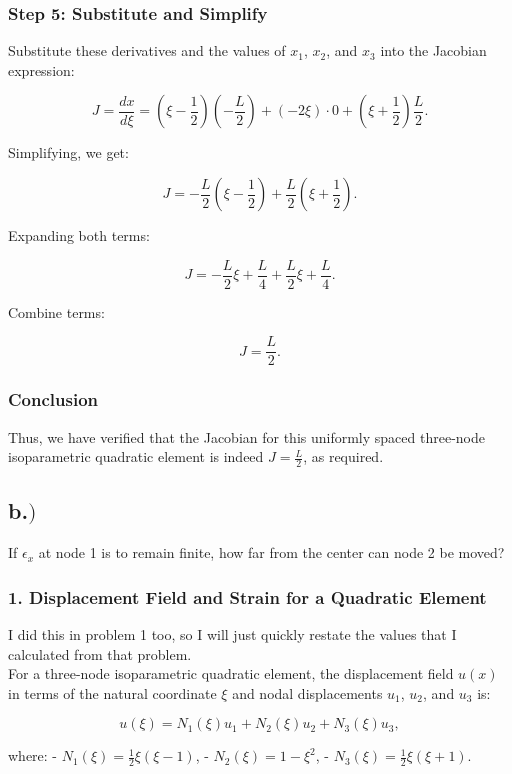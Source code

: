 \subsubsection*{Step 5: Substitute and Simplify}
Substitute these derivatives and the values of \( x_1 \), \( x_2 \), and \( x_3 \) into the Jacobian expression:

\[
J = \frac{dx}{d\xi} = \left(\xi - \frac{1}{2}\right) \left(-\frac{L}{2}\right) + (-2\xi) \cdot 0 + \left(\xi + \frac{1}{2}\right) \frac{L}{2}.
\]

Simplifying, we get:

\[
J = -\frac{L}{2} \left(\xi - \frac{1}{2}\right) + \frac{L}{2} \left(\xi + \frac{1}{2}\right).
\]

Expanding both terms:

\[
J = -\frac{L}{2} \xi + \frac{L}{4} + \frac{L}{2} \xi + \frac{L}{4}.
\]

Combine terms:

\[
J = \frac{L}{2}.
\]

\subsubsection*{Conclusion}
Thus, we have verified that the Jacobian for this uniformly spaced three-node isoparametric quadratic element is indeed \( J = \frac{L}{2} \), as required.

\subsection*{b.$)$}
If \( \epsilon_x \) at node 1 is to remain finite, how far from the center can node 2 be moved?


\subsubsection*{1. Displacement Field and Strain for a Quadratic Element}
I did this in problem 1 too, so I will just quickly restate the values that I calculated from that problem.\\

For a three-node isoparametric quadratic element, the displacement field \( u(x) \) in terms of the natural coordinate \( \xi \) and nodal displacements \( u_1 \), \( u_2 \), and \( u_3 \) is:

\[
u(\xi) = N_1(\xi) u_1 + N_2(\xi) u_2 + N_3(\xi) u_3,
\]

where:
- \( N_1(\xi) = \frac{1}{2} \xi (\xi - 1) \),
- \( N_2(\xi) = 1 - \xi^2 \),
- \( N_3(\xi) = \frac{1}{2} \xi (\xi + 1) \).

